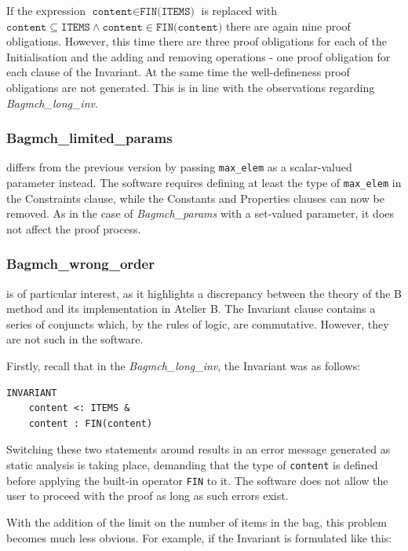 \documentclass[12pt,journal,duplex]{IEEEtran}
\begin{document}
	If the expression $\texttt{content} \in \texttt{FIN(ITEMS)}$ is replaced with $\texttt{content} \subseteq \texttt{ITEMS} \wedge \texttt{content} \in \texttt{FIN(content)}$ there are again nine proof obligations. However, this time there are three proof obligations for each of the Initialisation and the adding and removing operations - one proof obligation for each clause of the Invariant. At the same time the well-defineness proof obligations are not generated. This is in line with the observations regarding \emph{Bagmch\_long\_inv}.

	\subsubsection{Bagmch\_limited\_params} differs from the previous version by passing \texttt{max\_elem} as a scalar-valued parameter instead. The software requires defining at least the type of \texttt{max\_elem} in the Constraints clause, while the Constants and Properties clauses can now be removed. As in the case of \emph{Bagmch\_params} with a set-valued parameter, it does not affect the proof process.

	\subsubsection{Bagmch\_wrong\_order} is of particular interest, as it highlights a discrepancy between the theory of the B method and its implementation in Atelier B. The Invariant clause contains a series of conjuncts which, by the rules of logic, are commutative. However, they are not such in the software.

	Firstly, recall that in the \emph{Bagmch\_long\_inv}, the Invariant was as follows:

\begin{lstlisting}
INVARIANT
	content <: ITEMS &
	content : FIN(content)
\end{lstlisting}

	Switching these two statements around results in an error message generated as static analysis is taking place, demanding that the type of \texttt{content} is defined before applying the built-in operator \texttt{FIN} to it. The software does not allow the user to proceed with the proof as long as such errors exist.

	With the addition of the limit on the number of items in the bag, this problem becomes much less obvious. For example, if the Invariant is formulated like this:
\end{document}
